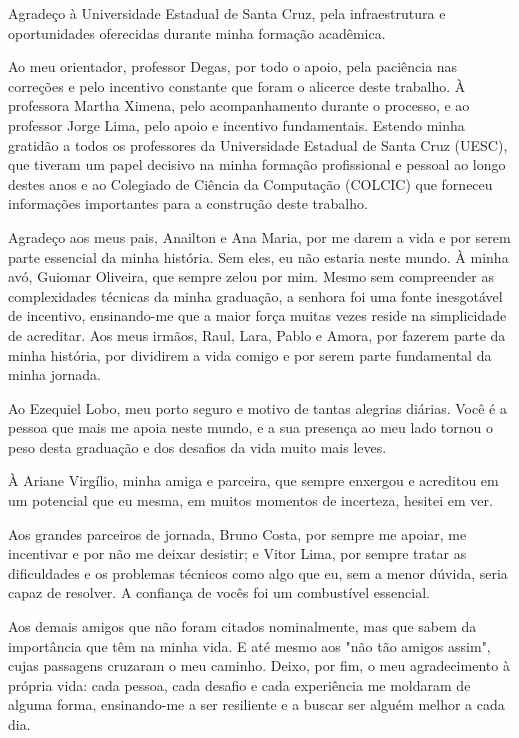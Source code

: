 \begin{agradecimentos}

Agradeço à Universidade Estadual de Santa Cruz, pela infraestrutura e oportunidades
oferecidas durante minha formação acadêmica.

Ao meu orientador, professor Degas, por todo o apoio, pela paciência nas correções e pelo incentivo constante que foram o alicerce deste trabalho. À professora Martha Ximena, pelo acompanhamento durante o processo, e ao professor Jorge Lima, pelo apoio e incentivo fundamentais. Estendo minha gratidão a todos os professores da Universidade Estadual de Santa Cruz (UESC), que tiveram um papel decisivo na minha formação profissional e pessoal ao longo destes anos e ao Colegiado de Ciência da Computação (COLCIC) que forneceu informações importantes para a construção deste trabalho.

Agradeço aos meus pais, Anailton e Ana Maria, por me darem a vida e por serem parte essencial da minha história. Sem eles, eu não estaria neste mundo. À minha avó, Guiomar Oliveira, que sempre zelou por mim. Mesmo sem compreender as complexidades técnicas da minha graduação, a senhora foi uma fonte inesgotável de incentivo, ensinando-me que a maior força muitas vezes reside na simplicidade de acreditar. Aos meus irmãos, Raul, Lara, Pablo e Amora, por fazerem parte da minha história, por dividirem a vida comigo e por serem parte fundamental da minha jornada.

Ao Ezequiel Lobo, meu porto seguro e motivo de tantas alegrias diárias. Você é a pessoa que mais me apoia neste mundo, e a sua presença ao meu lado tornou o peso desta graduação e dos desafios da vida muito mais leves.

À Ariane Virgílio, minha amiga e parceira, que sempre enxergou e acreditou em um potencial que eu mesma, em muitos momentos de incerteza, hesitei em ver.

Aos grandes parceiros de jornada, Bruno Costa, por sempre me apoiar, me incentivar e por não me deixar desistir; e Vitor Lima, por sempre tratar as dificuldades e os problemas técnicos como algo que eu, sem a menor dúvida, seria capaz de resolver. A confiança de vocês foi um combustível essencial.

Aos demais amigos que não foram citados nominalmente, mas que sabem da importância que têm na minha vida. E até mesmo aos "não tão amigos assim", cujas passagens cruzaram o meu caminho. Deixo, por fim, o meu agradecimento à própria vida: cada pessoa, cada desafio e cada experiência me moldaram de alguma forma, ensinando-me a ser resiliente e a buscar ser alguém melhor a cada dia.
\end{agradecimentos}
